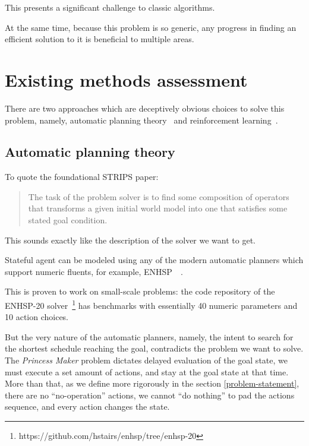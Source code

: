 \documentclass[12pt, a4paper]{report}
\begin{document}
	This presents a significant challenge to classic algorithms.
	
	At the same time, because this problem is so generic, any progress in finding an efficient solution to it is beneficial to multiple areas.
	
	\section{Existing methods assessment}\label{introduction:assessment}

	There are two approaches which are deceptively obvious choices to solve this problem, namely, automatic planning theory~\cite{fikes1971strips} and reinforcement learning~\cite{sutton2018reinforcement}.
	
  \subsection{Automatic planning theory}
  
  To quote the foundational STRIPS paper:
  
  \blockcquote[p.~190]{fikes1971strips}
  {The task of the problem solver is to find some composition of operators that transforms a given initial world model into one that satisfies some stated goal condition.}
  
  This sounds exactly like the description of the solver we want to get.
  
  	Stateful agent can be modeled using any of the modern automatic planners which support numeric fluents, for example, ENHSP~\cite{enhsp::scala2020subgoaling}~\cite{enhsp::Scala2016IntervalBasedRF}.
	
	This is proven to work on small-scale problems: the code repository of the ENHSP-20 solver~\footnote{https://github.com/hstairs/enhsp/tree/enhsp-20} has benchmarks with essentially 40 numeric parameters and 10 action choices.
	
	But the very nature of the automatic planners, namely, the intent to search for the shortest schedule reaching the goal, contradicts the problem we want to solve.
	The \textit{Princess Maker} problem dictates delayed evaluation of the goal state, we must execute a set amount of actions, and stay at the goal state at that time.
	More than that, as we define more rigorously in the section \ref{problem-statement}, there are no ``no-operation'' actions, we cannot ``do nothing'' to pad the actions sequence, and every action changes the state.
	
\end{document}
